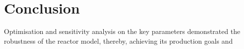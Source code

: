 \section{Conclusion} \label{sec:conclusion}


Optimisation and sensitivity analysis on the key parameters demonstrated the robustness of the reactor model, thereby, achieving its production goals and 